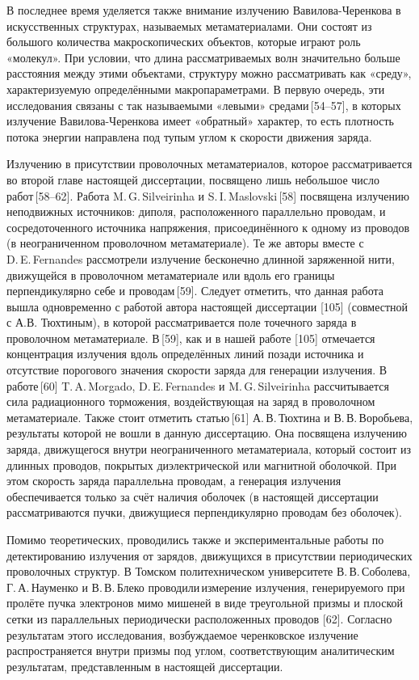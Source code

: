 В последнее время уделяется также внимание излучению Вавилова-Черенкова в искусственных структурах, называемых метаматериалами. Они состоят из большого количества макроскопических объектов, которые играют роль «молекул». При условии, что длина рассматриваемых волн значительно больше расстояния между этими объектами, структуру можно рассматривать как «среду», характеризуемую определёнными макропараметрами. В первую очередь, эти исследования связаны с так называемыми «левыми» средами [54–57], в которых излучение Вавилова-Черенкова имеет «обратный» характер, то есть плотность потока энергии направлена под тупым углом к скорости движения заряда.

Излучению в присутствии проволочных метаматериалов, которое рассматривается во второй главе настоящей диссертации, посвящено лишь небольшое число работ [58–62]. Работа M. G. Silveirinha и S. I. Maslovski [58] посвящена излучению неподвижных источников: диполя, расположенного параллельно проводам, и сосредоточенного источника напряжения, присоединённого к одному из проводов (в неограниченном проволочном метаматериале). Те же авторы вместе с D. E. Fernandes рассмотрели излучение бесконечно длинной заряженной нити, движущейся в проволочном метаматериале или вдоль его границы перпендикулярно себе и проводам [59]. Следует отметить, что данная работа вышла одновременно с работой автора настоящей диссертации [105] (совместной с А.В. Тюхтиным), в которой рассматривается поле точечного заряда в проволочном метаматериале. В [59], как и в нашей работе [105] отмечается концентрация излучения вдоль определённых линий позади источника и отсутствие порогового значения скорости заряда для генерации излучения. В работе [60] T. A. Morgado, D. E. Fernandes и M. G. Silveirinha рассчитывается сила радиационного торможения, воздействующая на заряд в проволочном метаматериале. Также стоит отметить статью [61] А. В. Тюхтина и В. В. Воробьева, результаты которой не вошли в данную диссертацию. Она посвящена излучению заряда, движущегося внутри неограниченного метаматериала, который состоит из длинных проводов, покрытых диэлектрической или магнитной оболочкой. При этом скорость заряда параллельна проводам, а генерация излучения обеспечивается только за счёт наличия оболочек (в настоящей диссертации рассматриваются пучки, движущиеся перпендикулярно проводам без оболочек).

Помимо теоретических, проводились также и экспериментальные работы по детектированию излучения от зарядов, движущихся в присутствии периодических проволочных структур. В Томском политехническом университете В. В. Соболева, Г. А. Науменко и В. В. Блеко проводили измерение излучения, генерируемого при пролёте пучка электронов мимо мишеней в виде треугольной призмы и плоской сетки из параллельных периодически расположенных проводов [62]. Согласно результатам этого исследования, возбуждаемое черенковское излучение распространяется внутри призмы под углом, соответствующим аналитическим результатам, представленным в настоящей диссертации.

